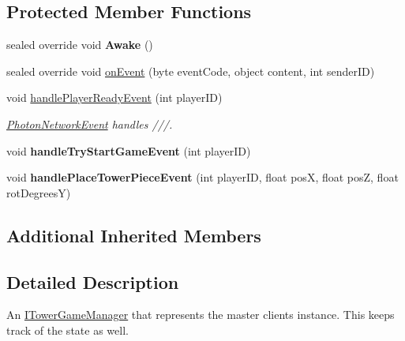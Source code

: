 \subsection*{Protected Member Functions}
\begin{DoxyCompactItemize}
\item 
sealed override void {\bfseries Awake} ()\hypertarget{class_tower_v_r_1_1_master_tower_game_manager_impl_a920da97216b0b70d5cc3c9d9a6ef0009}{}\label{class_tower_v_r_1_1_master_tower_game_manager_impl_a920da97216b0b70d5cc3c9d9a6ef0009}

\item 
sealed override void \hyperlink{class_tower_v_r_1_1_master_tower_game_manager_impl_a6b6e868d063e5c3a43908c0f81349cfb}{on\+Event} (byte event\+Code, object content, int sender\+ID)
\item 
void \hyperlink{class_tower_v_r_1_1_master_tower_game_manager_impl_a308a6d258b02fd2c9ee1f9e8d0445dd4}{handle\+Player\+Ready\+Event} (int player\+ID)\hypertarget{class_tower_v_r_1_1_master_tower_game_manager_impl_a308a6d258b02fd2c9ee1f9e8d0445dd4}{}\label{class_tower_v_r_1_1_master_tower_game_manager_impl_a308a6d258b02fd2c9ee1f9e8d0445dd4}

\begin{DoxyCompactList}\small\item\em \hyperlink{class_photon_network_event}{Photon\+Network\+Event} handles ///. \end{DoxyCompactList}\item 
void {\bfseries handle\+Try\+Start\+Game\+Event} (int player\+ID)\hypertarget{class_tower_v_r_1_1_master_tower_game_manager_impl_a8bdba4a2eac7580d0cdc1ee14f9d4623}{}\label{class_tower_v_r_1_1_master_tower_game_manager_impl_a8bdba4a2eac7580d0cdc1ee14f9d4623}

\item 
void {\bfseries handle\+Place\+Tower\+Piece\+Event} (int player\+ID, float posX, float posZ, float rot\+DegreesY)\hypertarget{class_tower_v_r_1_1_master_tower_game_manager_impl_ac6f458a4a2437d060b6940cf01603ebf}{}\label{class_tower_v_r_1_1_master_tower_game_manager_impl_ac6f458a4a2437d060b6940cf01603ebf}

\end{DoxyCompactItemize}
\subsection*{Additional Inherited Members}


\subsection{Detailed Description}
An \hyperlink{interface_tower_v_r_1_1_i_tower_game_manager}{I\+Tower\+Game\+Manager} that represents the master client\textquotesingle{}s instance. This keeps track of the state as well. 

